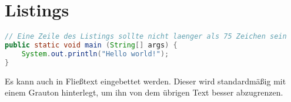 
\chapter{Listings}

\begin{lstlisting}[caption={Java Main-Methode},
    label={lst:java-main-method},
    language={java}]
// Eine Zeile des Listings sollte nicht laenger als 75 Zeichen sein
public static void main (String[] args) {
    System.out.println("Hello world!");
}
\end{lstlisting}

Es kann auch  in Fließtext eingebettet werden. Dieser 
wird standardmäßig mit einem Grauton hinterlegt, um ihn von dem übrigen
Text besser abzugrenzen.